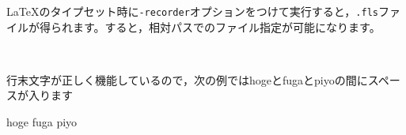 \documentclass{article}
\begin{document}
\LaTeX のタイプセット時に\texttt{-recorder}オプションをつけて実行すると，\texttt{.fls}ファイルが得られます。すると，相対パスでのファイル指定が可能になります。

\hogehoge

\hugahuga

\ 

行末文字が正しく機能しているので，次の例ではhogeとfugaとpiyoの間にスペースが入ります

hoge
fuga
piyo
\end{document}
